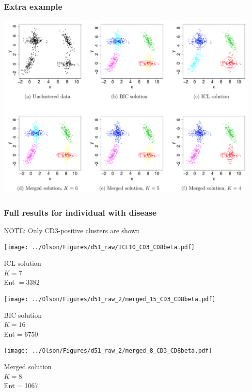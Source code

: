\documentclass[mathserif,compress]{beamer}
\renewcommand\;{\,}
\begin{document}
\begin{frame}\frametitle{Extra example}
\begin{center}
\includegraphics[width=\linewidth]{ExtraExample.png}
\end{center}
\end{frame}

\begin{frame}\frametitle{Full results for individual with disease}
\alert{NOTE}: Only CD3-positive clusters are shown
\begin{center}
\begin{minipage}{0.3\linewidth}
\texttt{[image: ../Olson/Figures/d51\_raw/ICL10\_CD3\_CD8beta.pdf]}
\begin{center}
ICL solution
\\$K = 7$
\\Ent $=3382$ 
\end{center}
\end{minipage}
\hfill
\begin{minipage}{0.3\linewidth}
\texttt{[image: ../Olson/Figures/d51\_raw\_2/merged\_15\_CD3\_CD8beta.pdf]}
\begin{center}
BIC solution
\\
$K = 16$
\\
Ent = 6750
\end{center}
\end{minipage}
\hfill
\begin{minipage}{0.3\linewidth}
\texttt{[image: ../Olson/Figures/d51\_raw\_2/merged\_8\_CD3\_CD8beta.pdf]}
\begin{center}
Merged solution
\\
$K = 8$
\\
Ent = 1067
\end{center}
\end{minipage}
\end{center}
\end{frame}
\end{document}
